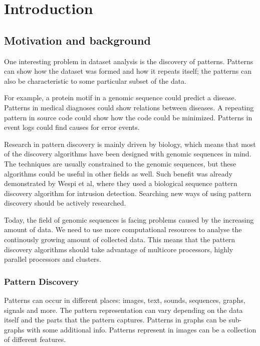 \chapter{Introduction}
\label{c:introduction}

\section{Motivation and background}

One interesting problem in dataset analysis is the discovery of patterns. Patterns can show how the dataset was formed and how it repeats itself; the patterns can also be characteristic to some particular subset of the data.

For example, a protein motif in a genomic sequence could predict a disease. Patterns in medical diagnoses could show relations between diseases. A repeating pattern in source code could show how the code could be minimized. Patterns in event logs could find causes for error events.

Research in pattern discovery is mainly driven by biology, which means that most of the discovery algorithms have been designed with genomic sequences in mind. The techniques are usually constrained to the genomic sequences, but these algorithms could be useful in other fields as well. Such benefit was already demonstrated by Wespi et al\cite{IntrusionDetection}, where they used a biological sequence pattern discovery algorithm for intrusion detection. Searching new ways of using pattern discovery should be actively researched.

Today, the field of genomic sequences is facing problems caused by the increasing amount of data\cite{HowIsGenomeDoing}. We need to use more computational resources to analyse the continously growing amount of collected data. This means that the pattern discovery algorithms should take advantage of multicore processors, highly parallel processors and clusters.

\subsection{Pattern Discovery}

Patterns can occur in different places: images, text, sounds, sequences, graphs, signals and more. The pattern representation can vary depending on the data itself and the parts that the pattern captures. Patterns in graphs can be sub-graphs with some additional info. Patterns represent in images can be a collection of different features.

